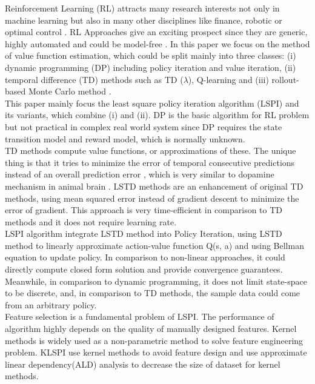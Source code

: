 Reinforcement Learning (RL) attracts many research interests not only in machine learning but also in many other disciplines like finance, robotic or optimal control \cite{kaelbling1996reinforcement}. RL Approaches give an exciting prospect since they are generic, highly automated and could be model-free \cite{rajeswaran2017towards}. 
In this paper we focus on the method of value function estimation, which could be split mainly into three classes: (i) dynamic programming (DP) including policy iteration and value iteration, (ii) temporal difference (TD) methods such as TD ($\lambda$), Q-learning and (iii)  rollout-based Monte Carlo method \cite{kober2013reinforcement}.\\
This paper mainly focus the least square policy iteration algorithm (LSPI) and its variants, which combine (i) and (ii). DP is the basic algorithm for RL problem but not practical in complex real world system since DP requires the state transition model and reward model, which is normally unknown. 
\\
TD methods compute value functions, or approximations of these. The unique thing is that it tries to minimize the error of temporal  consecutive predictions instead of an overall
prediction error \cite{kunz2000introduction}, which is very similar to dopamine mechanism in animal brain \cite{glimcher2011understanding}. LSTD methods are an enhancement of original TD methods, using mean squared error instead of gradient descent to minimize the error of gradient. This approach is very time-efficient in comparison to TD methods and it does not require learning rate.
\\
LSPI algorithm integrate LSTD method into Policy Iteration, using LSTD method to linearly approximate  action-value function Q(s, a) and using Bellman equation to update policy. In comparison to non-linear approaches, it could directly compute closed form solution and provide convergence guarantees. Meanwhile, in comparison to dynamic programming, it does not limit state-space to be discrete, and, in comparison to TD methods, the sample data could come from an arbitrary policy. \\
Feature selection is a fundamental problem of LSPI. The performance of algorithm highly depends on the quality of manually designed features. Kernel methods is widely used as a non-parametric method to solve feature engineering problem. KLSPI use kernel methods to avoid feature design and use approximate linear dependency(ALD) analysis to decrease the size of dataset for kernel methods.

